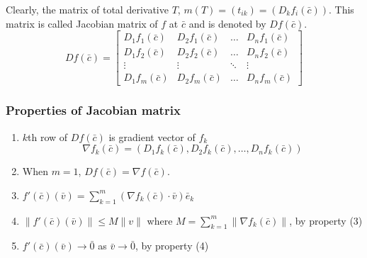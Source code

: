 Clearly, the matrix of total derivative $T$, $m(T) = (t_{ik}) = (D_k f_i(\bar{c}))$.
This matrix is called Jacobian matrix of $f$ at $\bar{c}$ and is denoted by $Df(\bar{c})$.
\[ Df(\bar{c}) = \begin{bmatrix} D_1 f_1(\bar{c}) & D_2 f_1(\bar{c}) & \dots & D_n f_1(\bar{c}) \\ D_1 f_2(\bar{c}) & D_2 f_2(\bar{c}) & \dots & D_n f_2(\bar{c}) \\ \vdots & \vdots & \ddots & \vdots \\ D_1 f_m(\bar{c}) & D_2 f_m(\bar{c}) & \dots & D_n f_m(\bar{c}) \end{bmatrix} \]

\subsubsection{Properties of Jacobian matrix}
\begin{enumerate}
	\item $k$th row of $Df(\bar{c})$ is gradient vector of $f_k$
		\[\nabla f_k(\bar{c}) = (D_1f_k(\bar{c}),D_2f_k(\bar{c}),\dots,D_nf_k(\bar{c}))\]
	\item When $m = 1$, $Df(\bar{c}) = \nabla f(\bar{c})$.
	\item $f'(\bar{c})(\bar{v}) = \sum\limits_{k=1}^m \left(\nabla f_k(\bar{c}) \cdot \bar{v}\right) \bar{e}_k$
	\item $\|f'(\bar{c})(\bar{v})\| \le M\|v\|$ where $M = \sum\limits_{k=1}^m \|\nabla f_k(\bar{c})\| $, by property (3)
	\item $f'(\bar{c})(\bar{v}) \to \bar{0}$ as $\bar{v} \to \bar{0}$, by property (4)
\end{enumerate}

